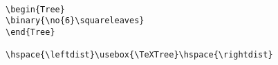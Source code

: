 \begin{Figure}                                                                  
\centering                                                                      
\begin{Tree}                                                                    
\end{Tree}
                                                                      
\hspace{\leftdist}\usebox{\TeXTree}\hspace{\rightdist}\                         
                                                                     
\begin{verbatim}                                                                
\begin{Tree}                                                                    
\binary{\no{6}\squareleaves}                                                    
\end{Tree}
                                                                      
\hspace{\leftdist}\usebox{\TeXTree}\hspace{\rightdist}
\end{verbatim}                                                                  
\caption{This is an example of a complete binary tree.}                                     
\end{Figure} 

